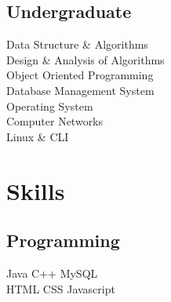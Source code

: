 \documentclass[]{swapnanil-resume}
\begin{document}
\begin{minipage}[t]{0.33\textwidth}
\subsection{Undergraduate}
Data Structure \& Algorithms \\
Design \& Analysis of Algorithms \\
Object Oriented Programming \\
Database Management System \\
Operating System \\
Computer Networks \\
Linux \& CLI
\sectionsep


\section{Skills}
\subsection{Programming}
Java \textbullet{} C++ \textbullet{} MySQL 
\\
HTML \textbullet{} CSS \textbullet{} Javascript \\

%
%
\end{minipage} 
\hfill
\end{document}
